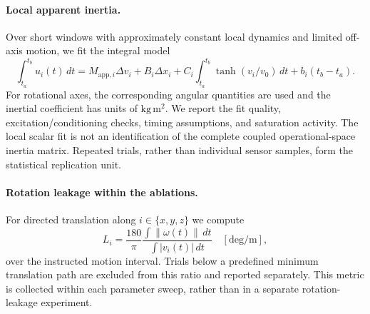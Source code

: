 \paragraph{Local apparent inertia.}
Over short windows with approximately constant local dynamics and limited
off-axis motion, we fit the integral model
\begin{equation}
 \int_{t_a}^{t_b}u_i(t)\,dt =
 M_{\mathrm{app},i}\Delta v_i+B_i\Delta x_i+
 C_i\int_{t_a}^{t_b}\tanh(v_i/v_0)\,dt+b_i(t_b-t_a).
\end{equation}
For rotational axes, the corresponding angular quantities are used and the
inertial coefficient has units of $\mathrm{kg\,m^2}$. We report the fit quality,
excitation/conditioning checks, timing assumptions, and saturation activity.
The local scalar fit is not an identification of the complete coupled
operational-space inertia matrix. Repeated trials, rather than individual
sensor samples, form the statistical replication unit.

\paragraph{Rotation leakage within the ablations.}
For directed translation along $i\in\{x,y,z\}$ we compute
\begin{equation}
 L_i=\frac{180}{\pi}
 \frac{\int\|\omega(t)\|\,dt}{\int |v_i(t)|\,dt}
 \quad[\mathrm{deg/m}],
\end{equation}
over the instructed motion interval. Trials below a predefined minimum
translation path are excluded from this ratio and reported separately.
This metric is collected within each parameter sweep, rather than in a
separate rotation-leakage experiment.

